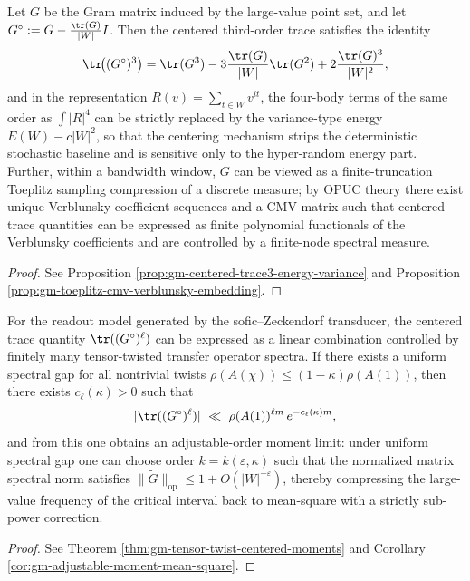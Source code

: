 \begin{conclusion}\label{con:xi-terminal-centered-trace3-opuc-cmv}
Let \(G\) be the Gram matrix induced by the large-value point set, and let
\(
G^\circ:=G-\frac{\tr(G)}{|W|}I
\).
Then the centered third-order trace satisfies the identity
\[
\tr\!\bigl((G^\circ)^3\bigr)
=\tr(G^3)-3\frac{\tr(G)}{|W|}\tr(G^2)+2\frac{\tr(G)^3}{|W|^2},
\]
and in the representation \(R(v)=\sum_{t\in W}v^{it}\), the four-body terms of the same order as \(\int |R|^4\) can be strictly replaced by the variance-type energy \(E(W)-c|W|^2\), so that the centering mechanism strips the deterministic stochastic baseline and is sensitive only to the hyper-random energy part.
Further, within a bandwidth window, \(G\) can be viewed as a finite-truncation Toeplitz sampling compression of a discrete measure; by OPUC theory there exist unique Verblunsky coefficient sequences and a CMV matrix such that centered trace quantities can be expressed as finite polynomial functionals of the Verblunsky coefficients and are controlled by a finite-node spectral measure.
\end{conclusion}
\begin{proof}[Proof]
See Proposition \ref{prop:gm-centered-trace3-energy-variance} and Proposition \ref{prop:gm-toeplitz-cmv-verblunsky-embedding}.
\end{proof}

\begin{conclusion}[Tensor closure of sofic twist operators: uniform spectral gap \texorpdfstring{$\Rightarrow$}{=>} all odd-order centered trace exponential compression \texorpdfstring{$\Rightarrow$}{=>} adjustable-order moment compresses large-value frequency back to mean-square]\label{con:xi-terminal-sofic-tensor-twist-moment-compression}
For the readout model generated by the sofic--Zeckendorf transducer, the centered trace quantity \(\tr((G^\circ)^\ell)\) can be expressed as a linear combination controlled by finitely many tensor-twisted transfer operator spectra.
If there exists a uniform spectral gap for all nontrivial twists \(\rho(A(\chi))\le (1-\kappa)\rho(A(1))\), then there exists \(c_\ell(\kappa)>0\) such that
\[
|\tr((G^\circ)^\ell)|\ \ll\ \rho(A(1))^{\ell m}\,e^{-c_\ell(\kappa)m},
\]
and from this one obtains an adjustable-order moment limit: under uniform spectral gap one can choose order \(k=k(\varepsilon,\kappa)\) such that the normalized matrix spectral norm satisfies \(\|\widetilde G\|_{\mathrm{op}}\le 1+O(|W|^{-\varepsilon})\), thereby compressing the large-value frequency of the critical interval back to mean-square with a strictly sub-power correction.
\end{conclusion}
\begin{proof}[Proof]
See Theorem \ref{thm:gm-tensor-twist-centered-moments} and Corollary \ref{cor:gm-adjustable-moment-mean-square}.
\end{proof}

